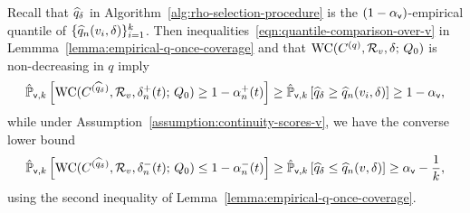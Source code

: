 

Recall that $\widehat{q}_\delta$ in
Algorithm~\ref{alg:rho-selection-procedure} is the $(1-\alpha_{\mathsf{v}})$-empirical
quantile of $\{\widehat{q}_n(v_i, \delta)\}_{i = 1}^k$.  Then
inequalities~\eqref{eqn:quantile-comparison-over-v} in
Lemmma~\ref{lemma:empirical-q-once-coverage} and that $\textup{WC}(C^{(q)},
\mathcal{R}_v, \delta; \, Q_0)$ is non-decreasing in $q$ imply
\begin{align*}
  \hat{\mathbb{P}}_{\mathsf{v},k}\left[ 
    \textup{WC}(C^{( \widehat{q}_\delta)}, \mathcal{R}_v, \delta^{+}_n(t); \, Q_0) 
    \ge 1 - \alpha^{+}_{n}(t) 
    \right] 
  \ge 
  \hat{\mathbb{P}}_{\mathsf{v},k} \left[ \widehat{q}_\delta \ge \widehat{q}_n(v_i, \delta) \right] 
  \ge 1-\alpha_{\mathsf{v}},
\end{align*}
while under Assumption~\ref{assumption:continuity-scores-v},
we have the converse lower bound
\begin{align*}
  \hat{\mathbb{P}}_{\mathsf{v},k}\left[ 
    \textup{WC}(C^{( \widehat{q}_\delta)}, \mathcal{R}_v, \delta^{-}_n(t); \, Q_0) 
    \le 1 - \alpha^{-}_{n}(t) \right]
  \ge
  \hat{\mathbb{P}}_{\mathsf{v},k}\left[\widehat{q}_\delta \le \widehat{q}_n(v, \delta)\right]
  \ge \alpha_{\mathsf{v}} - \frac{1}{k},
\end{align*}
using the second inequality of Lemma~\ref{lemma:empirical-q-once-coverage}.

